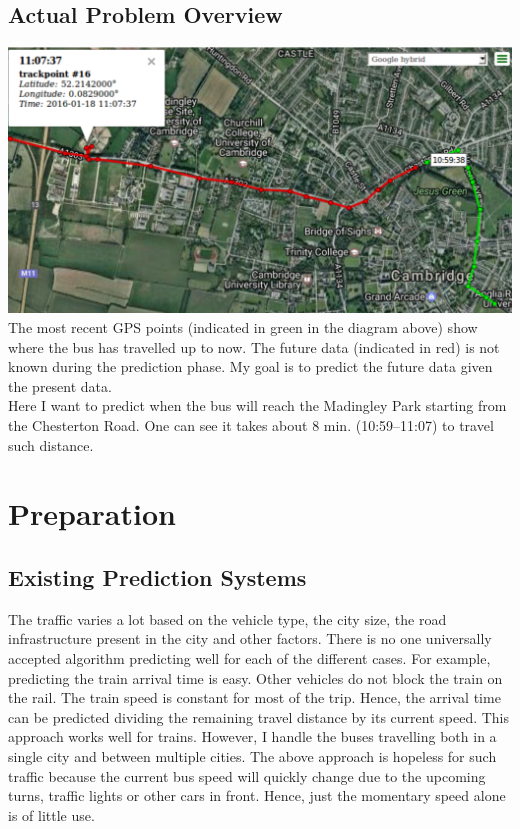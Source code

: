 \documentclass[12pt,a4paper,oneside,openright]{report}
\begin{document}
\section{Actual Problem Overview}

\includegraphics[width=\textwidth]{figs/problem_overview.png} \\

The most recent GPS points (indicated in green in the diagram above) show
where the bus has travelled up to now. The future data (indicated in red)
is not known during the prediction phase. My goal is to predict the future
data given the present data. \\

Here I want to predict when the bus will reach the Madingley Park starting from the
Chesterton Road. One can see it takes about 8 min. (10:59--11:07) to travel such distance.

\chapter{Preparation}

\section{Existing Prediction Systems}

The traffic varies a lot based on the vehicle type, the city size, the road
infrastructure present in the city and other factors. There is no one universally
accepted algorithm predicting well for each of the different cases. For example, predicting
the train arrival time is easy. Other vehicles do not block the train on the rail. The train
speed is constant for most of the trip. Hence, the arrival time can be predicted dividing the
remaining travel distance by its current speed. This approach works well for trains. However,
I handle the buses travelling both in a single city and between multiple cities. The above
approach is hopeless for such traffic because the current bus speed will quickly
change due to the upcoming turns, traffic lights or other cars in front. Hence, just the
momentary speed alone is of little use. \\
\end{document}
